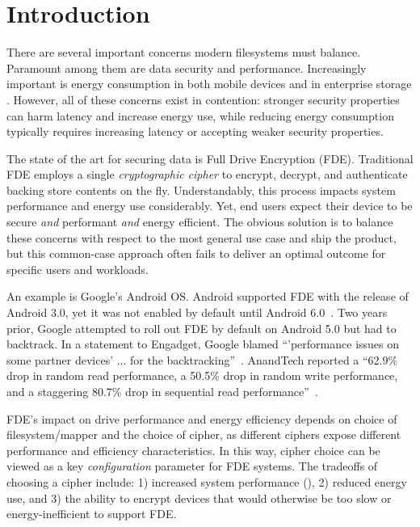 \section{Introduction}\label{sec:introduction}

There are several important concerns modern filesystems must balance. Paramount
among them are data security and performance. Increasingly important is energy
consumption in both mobile devices and in enterprise storage
\cite{DmC-Android,Thereska}. However, all of these
concerns exist in contention: stronger security properties can harm latency and
increase energy use, while reducing energy consumption typically requires
increasing latency or accepting weaker security properties.

The state of the art for securing data is Full Drive Encryption (FDE).
Traditional FDE employs a single \emph{cryptographic cipher} to encrypt,
decrypt, and authenticate backing store contents on the fly. Understandably,
this process impacts system performance and energy use considerably. Yet, end
users expect their device to be secure \emph{and} performant \emph{and} energy
efficient. The obvious solution is to balance these concerns with respect to the
most general use case and ship the product, but this common-case approach often
fails to deliver an optimal outcome for specific users and workloads.

An example is Google's Android OS. Android supported FDE with the release of
Android 3.0, yet it was not enabled by default until Android
6.0~\cite{android-M-mobile-motivation}. Two years prior, Google attempted to
roll out FDE by default on Android 5.0 but had to backtrack. In a statement to
Engadget, Google blamed ``'performance issues on some partner devices' ... for
the backtracking''~\cite{google-engadget}. AnandTech reported a ``62.9\% drop in
random read performance, a 50.5\% drop in random write performance, and a
staggering 80.7\% drop in sequential read
performance''~\cite{android-M-mobile-motivation-2}.

FDE's impact on drive performance and energy efficiency depends on choice of
filesystem/mapper and the choice of cipher, as different ciphers expose
different performance and efficiency characteristics. In this way, cipher choice
can be viewed as a key \emph{configuration} parameter for FDE systems. The
tradeoffs of choosing a cipher include: 1) increased system performance
(), 2) reduced energy use, and 3) the ability
to encrypt devices that would otherwise be too slow or energy-inefficient to
support FDE.

